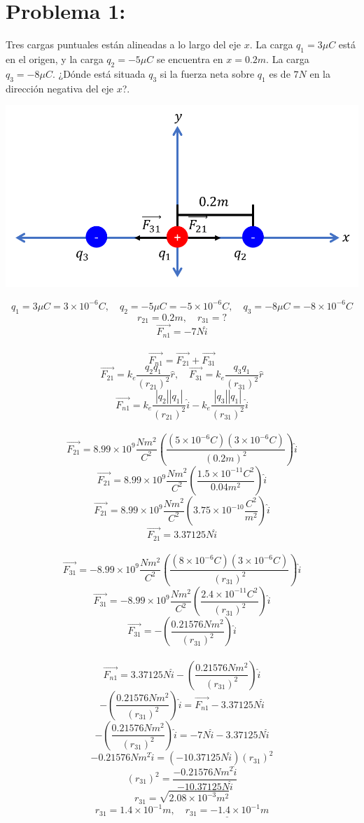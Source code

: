 \documentclass[12pt]{article}
\begin{document}
		\section{Problema 1:}\label{sec:Problema1}
			Tres cargas puntuales están alineadas a lo largo del eje $ x $. La carga $ q_1 = 3\mu C $ está en
			el origen, y la carga $ q_2 = -5\mu C $ se encuentra en $ x = 0.2m $. La carga $ q_3 = -8\mu C $.
			¿Dónde está situada $ q_3 $ si la fuerza neta sobre $ q_1 $ es de $ 7N $ en la dirección negativa
			del eje $ x $?.
			\begin{center}
				\includegraphics[width=.7\textwidth]{Imp1t1.png}
			\end{center}
			$$ q_1 = 3\mu C = 3 \times 10^{-6}C, \quad q_2 = -5\mu C = -5 \times 10^{-6}C, \quad q_3 = -8\mu C = -8 \times 10^{-6}C $$
			$$ r_{21} = 0.2m, \quad r_{31} = ? $$
			$$ \vec{F_{n1}} = -7N\hat{i} $$ \\
			$$ \vec{F_{n1}} = \vec{F_{21}} + \vec{F_{31}} $$
			$$ \vec{F_{21}} = k_e \frac{q_2q_1}{(r_{21})^2} \hat{r}, \quad \vec{F_{31}} = k_e \frac{q_3q_1}{(r_{31})^2} \hat{r} $$
			$$ \vec{F_{n1}} = k_e \frac{|q_2||q_1|}{(r_{21})^2} \hat{i} - k_e \frac{|q_3||q_1|}{(r_{31})^2} \hat{i} $$ \\
			$$ \vec{F_{21}} = 8.99 \times 10^9 \frac{Nm^2}{C^2} \left( \frac{(5 \times 10^{-6}C)(3 \times 10^{-6}C)}{(0.2m)^2} \right) \hat{i} $$
			$$ \vec{F_{21}} = 8.99 \times 10^9 \frac{Nm^2}{C^2} \left( \frac{1.5 \times 10^{-11}C^2}{0.04m^2} \right) \hat{i} $$
			$$ \vec{F_{21}} = 8.99 \times 10^9 \frac{Nm^2}{C^2} \left( 3.75 \times 10^{-10} \frac{C^2}{m^2} \right) \hat{i} $$
			$$ \vec{F_{21}} = 3.37125N \hat{i} $$ \\
			$$ \vec{F_{31}} = -8.99 \times 10^9 \frac{Nm^2}{C^2} \left( \frac{(8 \times 10^{-6}C)(3 \times 10^{-6}C)}{(r_{31})^2} \right) \hat{i} $$
			$$ \vec{F_{31}} = -8.99 \times 10^9 \frac{Nm^2}{C^2} \left( \frac{2.4 \times 10^{-11}C^2}{(r_{31})^2} \right) \hat{i} $$
			$$ \vec{F_{31}} = -\left( \frac{0.21576Nm^2}{(r_{31})^2} \right) \hat{i} $$ \\
			$$ \vec{F_{n1}} = 3.37125N \hat{i} - \left( \frac{0.21576Nm^2}{(r_{31})^2} \right) \hat{i} $$
			$$ -\left( \frac{0.21576Nm^2}{(r_{31})^2} \right) \hat{i} = \vec{F_{n1}} - 3.37125N \hat{i} $$
			$$ -\left( \frac{0.21576Nm^2}{(r_{31})^2} \right) \hat{i} = -7N \hat{i} - 3.37125N \hat{i} $$
			$$ -0.21576Nm^2 \hat{i} = (-10.37125N \hat{i})(r_{31})^2 $$
			$$ (r_{31})^2 = \frac{-0.21576Nm^2 \hat{i}}{-10.37125N \hat{i}}$$
			$$ r_{31} = \sqrt{2.08 \times 10^{-3}m^2}$$
			$$ r_{31} = 1.4 \times 10^{-1}m, \quad \underline{r_{31} = -1.4 \times 10^{-1}m} $$ \\
\end{document}
